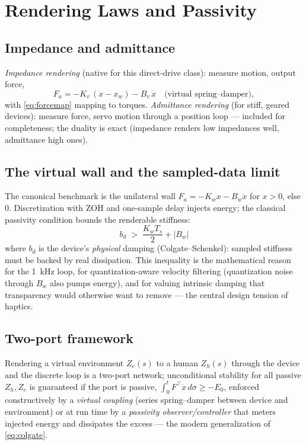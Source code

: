 \documentclass[conference]{IEEEtran}
\begin{document}
\section{Rendering Laws and Passivity}\label{sec:passivity}
\subsection{Impedance and admittance}
\emph{Impedance rendering} (native for this direct-drive class): measure motion, output force,
\begin{equation}
F_a = -K_v\,(x - x_w) - B_v\,\dot x \quad\text{(virtual spring--damper)},
\label{eq:impedance}
\end{equation}
with \eqref{eq:forcemap} mapping to torques. \emph{Admittance rendering} (for stiff, geared devices): measure force, servo motion through a position loop --- included for completeness; the duality is exact (impedance renders low impedances well, admittance high ones).

\subsection{The virtual wall and the sampled-data limit}
The canonical benchmark is the unilateral wall $F_a = -K_w x - B_w\dot x$ for $x > 0$, else $0$. Discretization with ZOH and one-sample delay injects energy; the classical passivity condition bounds the renderable stiffness:
\begin{equation}
\boxed{\; b_d \;>\; \frac{K_w T_s}{2} + |B_w| \;}
\label{eq:colgate}
\end{equation}
where $b_d$ is the device's \emph{physical} damping (Colgate--Schenkel): sampled stiffness must be backed by real dissipation. This inequality is the mathematical reason for the 1~kHz loop, for quantization-aware velocity filtering (quantization noise through $B_w$ also pumps energy), and for valuing intrinsic damping that transparency would otherwise want to remove --- the central design tension of haptics.

\subsection{Two-port framework}
Rendering a virtual environment $Z_e(s)$ to a human $Z_h(s)$ through the device and the discrete loop is a two-port network; unconditional stability for all passive $Z_h, Z_e$ is guaranteed if the port is passive,
$\int_0^t F^{\!\top}\dot x\,d\sigma \ge -E_0$, enforced constructively by a \emph{virtual coupling} (series spring--damper between device and environment) or at run time by a \emph{passivity observer/controller} that meters injected energy and dissipates the excess --- the modern generalization of \eqref{eq:colgate}.
\end{document}
